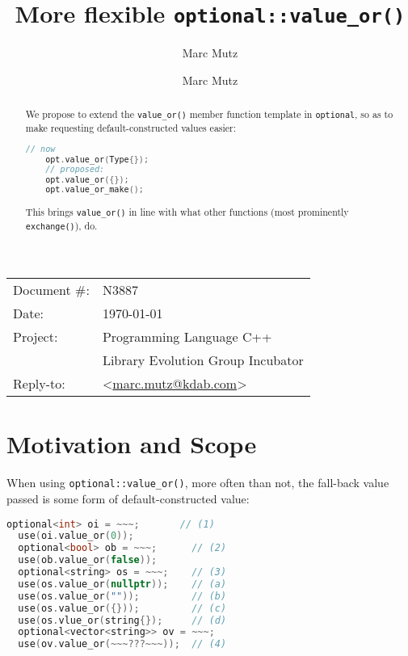 \documentclass[11pt]{article}
\date{}
\title{More flexible \texttt{optional::value\_or()}}
\author{Marc Mutz}
\makeatletter
\newcommand{\emailaddress}{marc.mutz@kdab.com}
\newcommand{\email}{\href{mailto:\emailaddress}{\emailaddress}}
\makeatother
\begin{document}
\maketitle%

\begin{tabular}{ll}
  Document \#:&N3887\\
  Date:       &\today\\
  Project:    &Programming Language C++\\
              &Library Evolution Group Incubator\\
  Reply-to:   &\author{Marc Mutz} \textless\email\textgreater
\end{tabular}
\vspace{1cm}
\begin{abstract}
  We propose to extend the \texttt{value\_or()} member function
  template in \texttt{optional}, so as to make requesting
  default-constructed values easier:
  \begin{lstlisting}[language=c++]
    // now
    opt.value_or(Type{});
    // proposed:
    opt.value_or({});
    opt.value_or_make();
  \end{lstlisting}
  This brings \texttt{value\_or()} in line with what other functions
  (most prominently \texttt{exchange()}), do.
\end{abstract}

\tableofcontents


\section{Motivation and Scope}

When using \texttt{optional::value\_or()}, more often than not, the
fall-back value passed is some form of default-constructed value:

\begin{lstlisting}[language=c++]
  optional<int> oi = ~~~;       // (1)
  use(oi.value_or(0));
  optional<bool> ob = ~~~;      // (2)
  use(ob.value_or(false));
  optional<string> os = ~~~;    // (3)
  use(os.value_or(nullptr));    // (a)
  use(os.value_or(""));         // (b)
  use(os.value_or({}));         // (c)
  use(os.vlue_or(string{});     // (d)
  optional<vector<string>> ov = ~~~;
  use(ov.value_or(~~~???~~~));  // (4)
\end{lstlisting}
\end{document}
